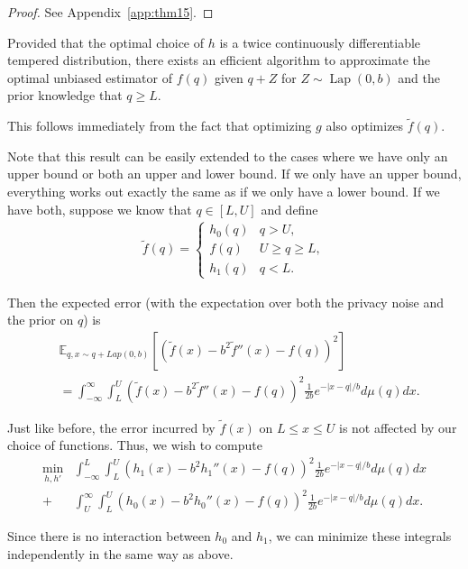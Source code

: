\documentclass[11pt]{article}
\newcommand{\Lap}{\operatorname{Lap}}
\begin{document}
\begin{proof}
    See Appendix~\ref{app:thm15}.
\end{proof}

\begin{corollary}
    Provided that the optimal choice of $h$ is a twice continuously differentiable tempered distribution, there exists an efficient algorithm to approximate the optimal unbiased estimator of $f(q)$ given $q+Z$ for $Z \sim \Lap(0,b)$ and the prior knowledge that $q \ge L$.
\end{corollary}

This follows immediately from the fact that optimizing $g$ also optimizes $\tilde{f}(q)$.


Note that this result can be easily extended to the cases where we have only an upper bound or both an upper and lower bound. If we only have an upper bound, everything works out exactly the same as if we only have a lower bound. If we have both, suppose we know that $q \in [L,U]$ and define
\begin{align}
    \tilde{f}(q) = \left\{\begin{matrix} h_0(q) & q > U, \\
    f(q) & U \ge q \ge L,\\
    h_1(q) & q < L.
    \end{matrix}  \right.
\end{align}

Then the expected error (with the expectation over both the privacy noise and the prior on $q$) is
\begin{align}
  &\mathbb{E}_{q, x \sim q + Lap(0,b)} \left[ \left(\tilde{f}(x) - b^2 \tilde{f}''(x) - f(q)\right)^2 \right] \\
  &= \int_{-\infty}^\infty \int_L^U \left(\tilde{f}(x) - b^2 \tilde{f}''(x) - f(q)\right)^2 \frac{1}{2b} e^{-|x-q|/b} d\mu(q)dx. \nonumber
\end{align}

Just like before, the error incurred by $\tilde{f}(x)$ on $L \le x \le U$ is not affected by our choice of functions. Thus, we wish to compute
\begin{align}\min_{h,h'}&\int_{-\infty}^L \int_L^U \left(h_1(x) - b^2 h_1''(x) - f(q)\right)^2 \frac{1}{2b} e^{-|x-q|/b} d\mu(q)dx\\
+& \int_{U}^\infty \int_L^U \left(h_0(x) - b^2 h_0''(x) - f(q)\right)^2 \frac{1}{2b} e^{-|x-q|/b} d\mu(q)dx. \nonumber
\end{align}

Since there is no interaction between $h_0$ and $h_1$, we can minimize these integrals independently in the same way as above.
\end{document}
